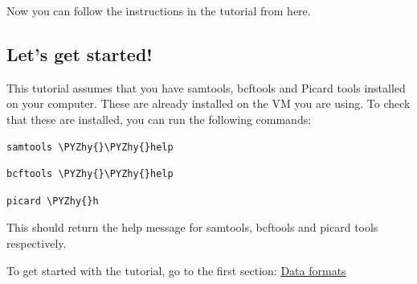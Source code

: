 \documentclass[11pt]{article}
\makeatletter
\def\PYZhy{\char`\-}
\newcommand{\boxspacing}{\kern\kvtcb@left@rule\kern\kvtcb@boxsep}
\newcommand{\prompt}[4]{
        {\ttfamily\llap{{\color{blue}\LARGE\faKeyboardO\hspace{3pt}#4}}\vspace{-\baselineskip}}
    }
\makeatother
\begin{document}
    Now you can follow the instructions in the tutorial from here.

\hypertarget{lets-get-started}{%
\subsection{Let's get started!}\label{lets-get-started}}

This tutorial assumes that you have samtools, bcftools and Picard tools
installed on your computer. These are already installed on the VM you
are using. To check that these are installed, you can run the following
commands:

    \begin{tcolorbox}[breakable, size=fbox, boxrule=1pt, pad at break*=1mm,colback=cellbackground, colframe=cellborder]
\prompt{In}{incolor}{ }{\boxspacing}
\begin{Verbatim}[commandchars=\\\{\}]
samtools \PYZhy{}\PYZhy{}help
\end{Verbatim}
\end{tcolorbox}

    \begin{tcolorbox}[breakable, size=fbox, boxrule=1pt, pad at break*=1mm,colback=cellbackground, colframe=cellborder]
\prompt{In}{incolor}{ }{\boxspacing}
\begin{Verbatim}[commandchars=\\\{\}]
bcftools \PYZhy{}\PYZhy{}help
\end{Verbatim}
\end{tcolorbox}

    \begin{tcolorbox}[breakable, size=fbox, boxrule=1pt, pad at break*=1mm,colback=cellbackground, colframe=cellborder]
\prompt{In}{incolor}{ }{\boxspacing}
\begin{Verbatim}[commandchars=\\\{\}]
picard \PYZhy{}h
\end{Verbatim}
\end{tcolorbox}

    This should return the help message for samtools, bcftools and picard
tools respectively.

To get started with the tutorial, go to the first section:
\href{formats.ipynb}{Data formats}





\newpage
\end{document}
